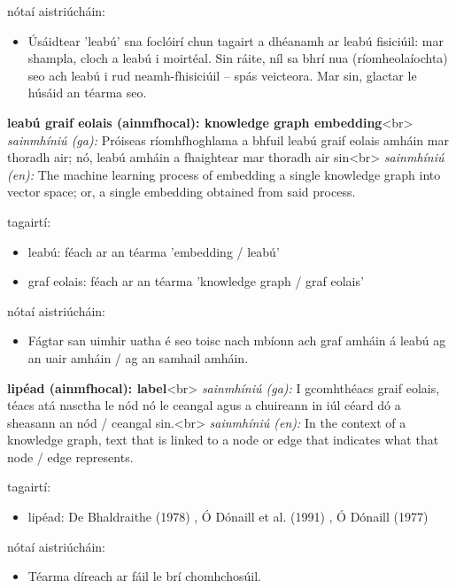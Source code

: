 \documentclass{article}
\begin{document}
nótaí aistriúcháin:
\begin{itemize}
	\item Úsáidtear 'leabú' sna foclóirí chun tagairt a dhéanamh ar leabú fisiciúil: mar shampla, cloch a leabú i moirtéal. Sin ráite, níl sa bhrí nua (ríomheolaíochta) seo ach leabú i rud neamh-fhisiciúil -- spás veicteora. Mar sin, glactar le húsáid an téarma seo.
\end{itemize}


\textbf{leabú graif eolais (ainmfhocal): knowledge graph embedding}<br>
\textit{sainmhíniú (ga):} Próiseas ríomhfhoghlama a bhfuil leabú graif eolais amháin mar thoradh air; nó, leabú amháin a fhaightear mar thoradh air sin<br>
\textit{sainmhíniú (en):} The machine learning process of embedding a single knowledge graph into vector space; or, a single embedding obtained from said process.

tagairtí:
\begin{itemize}
	\item leabú: féach ar an téarma 'embedding / leabú'
	\item graf eolais: féach ar an téarma 'knowledge graph / graf eolais'
\end{itemize}

nótaí aistriúcháin:
\begin{itemize}
	\item Fágtar san uimhir uatha é seo toisc nach mbíonn ach graf amháin á leabú ag an uair amháin / ag an samhail amháin.
\end{itemize}


\textbf{lipéad (ainmfhocal): label}<br>
\textit{sainmhíniú (ga):} I gcomhthéacs graif eolais, téacs atá nasctha le nód nó le ceangal agus a chuireann in iúl céard dó a sheasann an nód / ceangal sin.<br>
\textit{sainmhíniú (en):} In the context of a knowledge graph, text that is linked to a node or edge that indicates what that node / edge represents.

tagairtí:
\begin{itemize}
	\item lipéad: De Bhaldraithe (1978) \cite{de-bhaldraithe}, Ó Dónaill et al. (1991) \cite{focloir-beag}, Ó Dónaill (1977) \cite{odonaill}
\end{itemize}

nótaí aistriúcháin:
\begin{itemize}
	\item Téarma díreach ar fáil le brí chomhchosúil.
\end{itemize}
\end{document}
